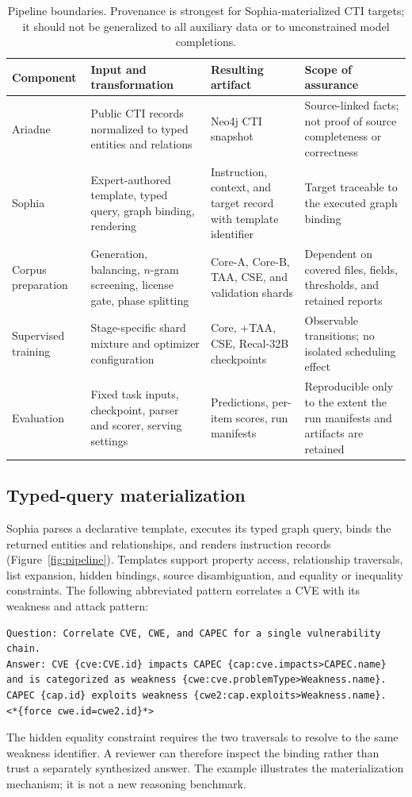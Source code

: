 \documentclass[preprint,12pt,authoryear]{elsarticle}
\begin{document}
\begin{table}[!htbp]
\centering\footnotesize
\caption{Pipeline boundaries. Provenance is strongest for Sophia-materialized CTI targets; it should not be generalized to all auxiliary data or to unconstrained model completions.}\label{tab:boundaries}
\begin{tabularx}{\textwidth}{@{}p{2.4cm}XXX@{}}
\toprule Component & Input and transformation & Resulting artifact & Scope of assurance \\\midrule
Ariadne & Public CTI records normalized to typed entities and relations & Neo4j CTI snapshot & Source-linked facts; not proof of source completeness or correctness \\
Sophia & Expert-authored template, typed query, graph binding, rendering & Instruction, context, and target record with template identifier & Target traceable to the executed graph binding \\
Corpus preparation & Generation, balancing, $n$-gram screening, license gate, phase splitting & Core-A, Core-B, TAA, CSE, and validation shards & Dependent on covered files, fields, thresholds, and retained reports \\
Supervised training & Stage-specific shard mixture and optimizer configuration & Core, +TAA, CSE, Recal-32B checkpoints & Observable transitions; no isolated scheduling effect \\
Evaluation & Fixed task inputs, checkpoint, parser and scorer, serving settings & Predictions, per-item scores, run manifests & Reproducible only to the extent the run manifests and artifacts are retained \\\bottomrule
\end{tabularx}
\end{table}

\subsection{Typed-query materialization}
Sophia parses a declarative template, executes its typed graph query, binds the returned entities and relationships, and renders instruction records (Figure~\ref{fig:pipeline}). Templates support property access, relationship traversals, list expansion, hidden bindings, source disambiguation, and equality or inequality constraints. The following abbreviated pattern correlates a CVE with its weakness and attack pattern:
\begin{lstlisting}
Question: Correlate CVE, CWE, and CAPEC for a single vulnerability chain.
Answer: CVE {cve:CVE.id} impacts CAPEC {cap:cve.impacts>CAPEC.name}
and is categorized as weakness {cwe:cve.problemType>Weakness.name}.
CAPEC {cap.id} exploits weakness {cwe2:cap.exploits>Weakness.name}.
<*{force cwe.id=cwe2.id}*>
\end{lstlisting}
The hidden equality constraint requires the two traversals to resolve to the same weakness identifier. A reviewer can therefore inspect the binding rather than trust a separately synthesized answer. The example illustrates the materialization mechanism; it is not a new reasoning benchmark.
\end{document}

